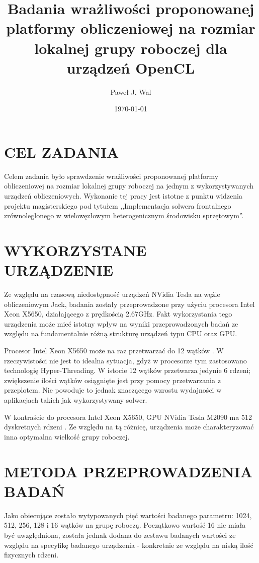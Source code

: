 \documentclass[12pt,a4paper,twoside]{article}
\title{Badania wrażliwości proponowanej platformy obliczeniowej na rozmiar lokalnej grupy roboczej dla urządzeń OpenCL}
\author{Paweł J. Wal}
\date{\today}
\begin{document}
\maketitle

\section{CEL ZADANIA}

Celem zadania było sprawdzenie wrażliwości proponowanej platformy obliczeniowej na rozmiar lokalnej grupy roboczej na jednym z wykorzystywanych urządzeń obliczeniowych. Wykonanie tej pracy jest istotne z punktu widzenia projektu magisterskiego pod tytułem ,,Implementacja solwera frontalnego zrównoleglonego w wielowęzłowym heterogenicznym środowisku sprzętowym''.

\section{WYKORZYSTANE URZĄDZENIE}

Ze względu na czasową niedostępność urządzeń NVidia Tesla na węźle obliczeniowym Jack, badania zostały przeprowadzone przy użyciu procesora Intel Xeon X5650, działającego z prędkością 2.67GHz. Fakt wykorzystania tego urządzenia może mieć istotny wpływ na wyniki przeprowadzonych badań ze względu na fundamentalnie różną strukturę urządzeń typu CPU oraz GPU.

Procesor Intel Xeon X5650 może na raz przetwarzać do 12 wątków \cite{intel}. W rzeczywistości nie jest to idealna sytuacja, gdyż w procesorze tym zastosowano technologię Hyper-Threading. W istocie 12 wątków przetwarza jedynie 6 rdzeni; zwiększenie ilości wątków osiągnięte jest przy pomocy przetwarzania z przeplotem. Nie powoduje to jednak znaczącego wzrostu wydajności w aplikacjach takich jak wykorzystywany solwer.

W kontraście do procesora Intel Xeon X5650, GPU NVidia Tesla M2090 ma 512 dyskretnych rdzeni \cite{nvidia}. Ze względu na tą różnicę, urządzenia może charakteryzować inna optymalna wielkość grupy roboczej.

\section{METODA PRZEPROWADZENIA BADAŃ}

Jako obiecujące zostało wytypowanych pięć wartości badanego parametru: 1024, 512, 256, 128 i 16 wątków na grupę roboczą. Początkowo wartość 16 nie miała być uwzględniona, została jednak dodana do zestawu badanych wartości ze względu na specyfikę badanego urządzenia - konkretnie ze względu na niską ilość fizycznych rdzeni.
\end{document}
